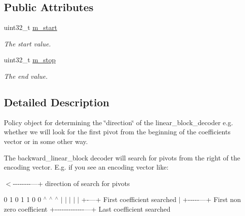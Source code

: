 \subsection*{Public Attributes}
\begin{DoxyCompactItemize}
\item 
\hypertarget{structkodo_1_1backward__linear__block__decoder__policy_adf9dba112cac43559f19b4b6947c6527}{uint32\-\_\-t \hyperlink{structkodo_1_1backward__linear__block__decoder__policy_adf9dba112cac43559f19b4b6947c6527}{m\-\_\-start}}\label{structkodo_1_1backward__linear__block__decoder__policy_adf9dba112cac43559f19b4b6947c6527}

\begin{DoxyCompactList}\small\item\em The start value. \end{DoxyCompactList}\item 
\hypertarget{structkodo_1_1backward__linear__block__decoder__policy_a59ce0e2bb571bf514df1006c94b87211}{uint32\-\_\-t \hyperlink{structkodo_1_1backward__linear__block__decoder__policy_a59ce0e2bb571bf514df1006c94b87211}{m\-\_\-stop}}\label{structkodo_1_1backward__linear__block__decoder__policy_a59ce0e2bb571bf514df1006c94b87211}

\begin{DoxyCompactList}\small\item\em The end value. \end{DoxyCompactList}\end{DoxyCompactItemize}


\subsection{Detailed Description}
Policy object for determining the \char`\"{}direction\char`\"{} of the linear\-\_\-block\-\_\-decoder e.\-g. whether we will look for the first pivot from the beginning of the coefficients vector or in some other way.

The backward\-\_\-linear\-\_\-block decoder will search for pivots from the right of the encoding vector. E.\-g. if you see an encoding vector like\-:

$<$-\/-\/-\/-\/-\/-\/-\/-\/---+ direction of search for pivots

0 1 0 1 1 0 0 $^\wedge$ $^\wedge$ $^\wedge$ $|$ $|$ $|$ $|$ $|$ +-\/---+ First coefficient searched $|$ +-\/-\/-\/-\/-\/---+ First non zero coefficient +-\/-\/-\/-\/-\/-\/-\/-\/-\/-\/-\/-\/-\/---+ Last coefficient searched 

